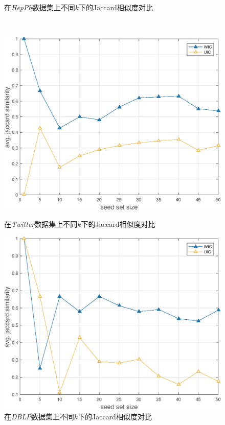 \begin{figure}[ht]
\begin {minipage}{0.48\textwidth}
     \caption{在\textit{HepPh}数据集上不同$k$下的Jaccard相似度对比}
     \label{fig:hepPhJaccard}
   \end{minipage}
   \\
   \begin{minipage}{0.48\textwidth}
     \centering
     \includegraphics[width=\linewidth]{figures/twitterJaccard.eps}
     \caption{在\textit{Twitter}数据集上不同$k$下的Jaccard相似度对比}
     \label{fig:twitterJaccard}
   \end{minipage}
   \hfill
   \begin {minipage}{0.48\textwidth}
     \centering
     \includegraphics[width=\linewidth]{figures/dblpJaccard.eps}
     \caption{在\textit{DBLP}数据集上不同$k$下的Jaccard相似度对比}
     \label{fig:dblpJaccard}
   \end{minipage}
\end{figure}

